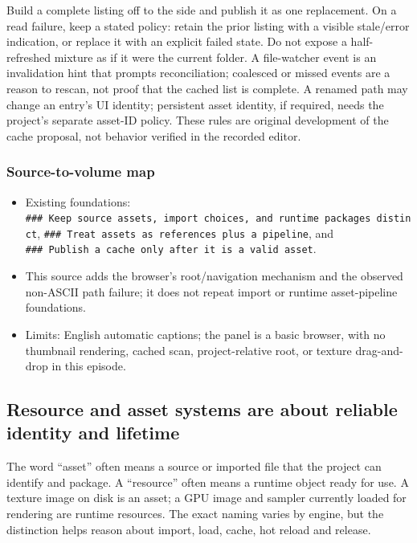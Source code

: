 Build a complete listing off to the side and publish it as one replacement. On a read failure, keep a stated policy: retain the prior listing with a visible stale/error indication, or replace it with an explicit failed state. Do not expose a half-refreshed mixture as if it were the current folder. A file-watcher event is an invalidation hint that prompts reconciliation; coalesced or missed events are a reason to rescan, not proof that the cached list is complete. A renamed path may change an entry's UI identity; persistent asset identity, if required, needs the project's separate asset-ID policy. These rules are original development of the cache proposal, not behavior verified in the recorded editor.

\subsubsection{Source-to-volume map}\label{06-engine-ii-ch027-source-to-volume-map}

\hypertarget{06-engine-ii-ch027-source-to-volume-map}{}

\begin{itemize}
\tightlist
\item
  Existing foundations: \texttt{\#\#\#\ Keep\ source\ assets,\ import\ choices,\ and\ runtime\ packages\ distinct}, \texttt{\#\#\#\ Treat\ assets\ as\ references\ plus\ a\ pipeline}, and \texttt{\#\#\#\ Publish\ a\ cache\ only\ after\ it\ is\ a\ valid\ asset}.
\item
  This source adds the browser's root/navigation mechanism and the observed non-ASCII path failure; it does not repeat import or runtime asset-pipeline foundations.
\item
  Limits: English automatic captions; the panel is a basic browser, with no thumbnail rendering, cached scan, project-relative root, or texture drag-and-drop in this episode.
\end{itemize}

\subsection{Resource and asset systems are about reliable identity and lifetime}\label{06-engine-ii-ch027-resource-and-asset-systems-are-about-reliable-identity-and-lifetime}

\hypertarget{06-engine-ii-ch027-resource-and-asset-systems-are-about-reliable-identity-and-lifetime}{}

The word ``asset'' often means a source or imported file that the project can identify and package. A ``resource'' often means a runtime object ready for use. A texture image on disk is an asset; a GPU image and sampler currently loaded for rendering are runtime resources. The exact naming varies by engine, but the distinction helps reason about import, load, cache, hot reload and release.

